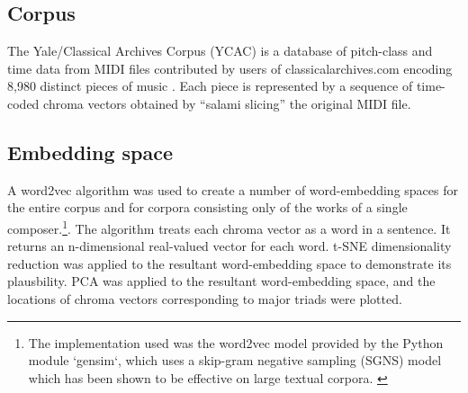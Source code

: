 \subsection{Corpus}\label{corpus}

The Yale/Classical Archives Corpus (YCAC) is a database of pitch-class
and time data from MIDI files contributed by users of
classicalarchives.com encoding 8,980 distinct pieces of music
\cite{white2014yale}. Each piece is represented by a sequence of
time-coded chroma vectors obtained by ``salami slicing'' the original
MIDI file.

\subsection{Embedding space}\label{embedding-space}

A word2vec algorithm was used to create a number of word-embedding
spaces for the entire corpus and for corpora consisting only of the
works of a single
composer.\footnote{The implementation used was the word2vec model provided by the Python module `gensim`, which uses a skip-gram negative sampling (SGNS) model which has been shown to be effective on large textual corpora. \cite{rehurek_lrec}}.
The algorithm treats each chroma vector as a word in a sentence. It
returns an n-dimensional real-valued vector for each word. t-SNE
dimensionality reduction was applied to the resultant word-embedding
space to demonstrate its plausbility. PCA was applied to the resultant
word-embedding space, and the locations of chroma vectors corresponding
to major triads were plotted.

